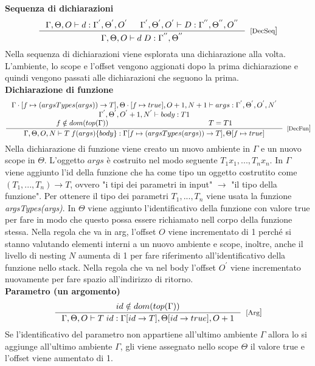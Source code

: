 \textbf{Sequenza di dichiarazioni}
\[
\inference{\Gamma, \Theta, O \vdash d:\Gamma^{'}, \Theta^{'}, O^{'} & \Gamma^{'}, \Theta^{'}, O^{'} \vdash D:\Gamma^{''}, \Theta^{''}, O^{''} }{\Gamma, \Theta, O \vdash d \; D: \Gamma^{''}, \Theta^{''}}[[DecSeq]]
\]
Nella sequenza di dichiarazioni viene esplorata una dichiarazione alla volta. L'ambiente, lo scope e l'offset vengono aggionati dopo la prima dichiarazione e quindi vengono passati alle dichiarazioni che seguono la prima. \\

\textbf{Dichiarazione di funzione}
\[
\inference{\Gamma \cdot [f \mapsto(argsTypes(args)) \rightarrow T], \Theta \cdot[f \mapsto true], O+1, N+1 \vdash args: \Gamma^{'}, \Theta^{'}, O^{'}, N^{'} \\ \Gamma^{'}, \Theta^{'}, O^{'}+1 , N^{'}\vdash body: T1 \\ f \notin dom(top(\Gamma)) & T= T1}{\Gamma, \Theta, O, N \vdash T \; f(args)\{body\} : \Gamma [f \mapsto(argsTypes(args)) \rightarrow T], \Theta [f \mapsto true]}[[DecFun]]
\]
Nella dichiarazione di funzione viene creato un nuovo ambiente in $\Gamma$ e un nuovo scope in $\Theta$. L'oggetto $args$ è costruito nel modo seguente $T_{1} x_{1}, ..., T_{n} x_{n}$. In $\Gamma$ viene aggiunto l'id della funzione che ha come tipo un oggetto costrutito come $(T_{1},..., T_{n}) \rightarrow T$, ovvero "i tipi dei parametri in input" $\rightarrow$ "il tipo della funzione". Per ottenere il tipo dei parametri $T_{1},..., T_{n}$ viene usata la funzione \textit{argsTypes(args)}. In $\Theta$ viene aggiunto l'identificativo della funzione con valore true per fare in modo che questo possa essere richiamato nell corpo della funzione stessa. Nella regola che va in arg, l'offset $O$ viene incrementato di 1 perché si stanno valutando elementi interni a un nuovo ambiente e scope, inoltre, anche il livello di nesting $N$ aumenta di 1 per fare riferimento all'identificativo della funzione nello stack. Nella regola che va nel body l'offset $O^{'}$ viene incrementato nuovamente per fare spazio all'indirizzo di ritorno. \\

\textbf{Parametro (un argomento)}
\[
\inference{id \notin dom(top(\Gamma))}{\Gamma, \Theta, O \vdash T \; id: \Gamma[id \rightarrow T], \Theta[id \rightarrow true] , O+1}[[Arg]]
\]
Se l'identificativo del parametro non appartiene all'ultimo ambiente $\Gamma$ allora lo si aggiunge all'ultimo ambiente $\Gamma$, gli viene assegnato nello scope $\Theta$ il valore true e l'offset viene aumentato di 1. \\


